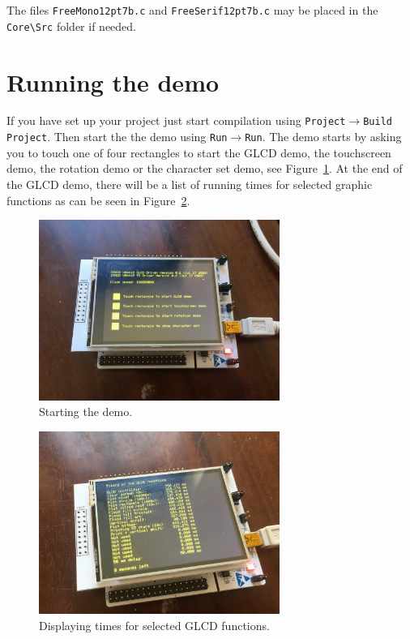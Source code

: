 \documentclass[12pt]{article}
\begin{document}
The files \lstinline|FreeMono12pt7b.c| and \lstinline|FreeSerif12pt7b.c| may be placed in the \lstinline|Core\Src| folder if needed.


\section{Running the demo}
If you have set up your project just start compilation using \texttt{Project}$\rightarrow$\texttt{Build Project}. Then start the the demo using \texttt{Run}$\rightarrow$\texttt{Run}. The demo starts by asking you to touch one of four rectangles to start the GLCD demo, the touchscreen demo, the rotation demo or the character set demo, see Figure~\ref{fig:2}. At the end of the GLCD demo, there will be a list of running times for selected graphic functions as can be seen in Figure~\ref{fig:3}.

\begin{figure}[!ht]
\centering
\includegraphics[width=0.7\textwidth]{start_demo}
\caption{Starting the demo.}
\label{fig:2}
\end{figure}

\begin{figure}[!ht]
\centering
\includegraphics[width=0.7\textwidth]{times}
\caption{Displaying times for selected GLCD functions.}
\label{fig:3}
\end{figure}
\end{document}
